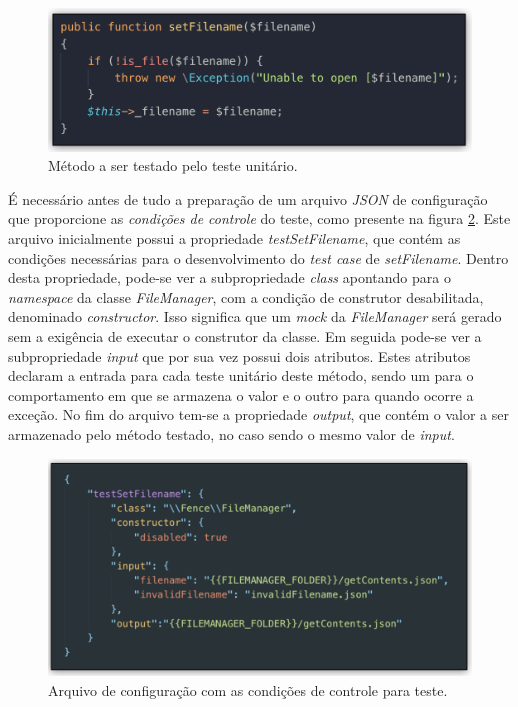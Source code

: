 \begin{figure}[H]
    \centering
    \includegraphics[width=13cm]{source/4-solucao/images/metodo-testado.png}
    \caption{Método a ser testado pelo teste unitário.}
    \label{fig:metodo-testado}
\end{figure}

É necessário antes de tudo a preparação de um arquivo \emph{JSON} de configuração que proporcione as \emph{condições de controle} do teste, como presente na figura \ref{fig:condicoes-de-controle}. Este arquivo inicialmente possui a propriedade \emph{testSetFilename}, que contém as condições necessárias para o desenvolvimento do \emph{test case} de \emph{setFilename}. Dentro desta propriedade, pode-se ver a subpropriedade \emph{class} apontando para o \emph{namespace} da classe \emph{FileManager}, com a condição de construtor desabilitada, denominado \emph{constructor}. Isso significa que um \emph{mock} da \emph{FileManager} será gerado sem a exigência de executar o construtor da classe. Em seguida pode-se ver a subpropriedade \emph{input} que por sua vez possui dois atributos. Estes atributos declaram a entrada para cada teste unitário deste método, sendo um para o comportamento em que se armazena o valor e o outro para quando ocorre a exceção. No fim do arquivo tem-se a propriedade \emph{output}, que contém o valor a ser armazenado pelo método testado, no caso sendo o mesmo valor de \emph{input}.

\begin{figure}[H]
    \centering
    \includegraphics[width=13cm]{source/4-solucao/images/condicoes-de-controle.png}
    \caption{Arquivo de configuração com as condições de controle para teste.}
    \label{fig:condicoes-de-controle}
\end{figure}


